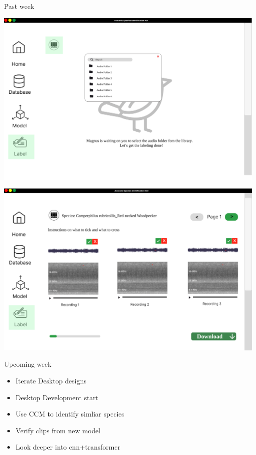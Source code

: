 \begin{frame}{Past week}
    \begin{minipage}[b]{0.45\textwidth}
        \centering
        \includegraphics[width=\textwidth]{images/sampleui4.png}
    \end{minipage}%
    \hspace{0.05\textwidth}
    \begin{minipage}[b]{0.45\textwidth}
        \centering
        \includegraphics[width=\textwidth]{images/sampleui3.png}
    \end{minipage}
\end{frame}

\begin{frame}{Upcoming week}
    \begin{itemize}
        \item Iterate Desktop designs
        \item Desktop Development start
        \item Use CCM to identify simliar species
        \item Verify clips from new model
        \item Look deeper into cnn+transformer
    \end{itemize}
\end{frame}